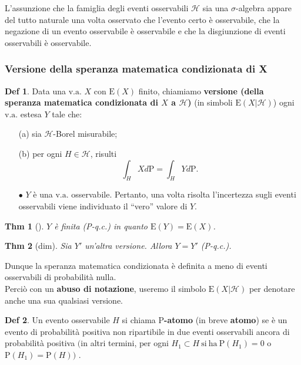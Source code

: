 \documentclass[a4paper,11pt]{article}
\theoremstyle{plain}
\newtheorem{thm}{Thm}[section]
\theoremstyle{definition}
\newtheorem{defn}{Def}[section]
\theoremstyle{remark}
\begin{document}
\noindent
L'assunzione che la famiglia degli eventi osservabili $\mathcal{H}$ sia una $\sigma$-algebra appare del tutto naturale una volta osservato che l'evento certo è osservabile, che la negazione di un evento osservabile è osservabile $\mathrm{e}$ che la disgiunzione di eventi osservabili è osservabile.

\subsubsection{Versione della speranza matematica condizionata di X}
\begin{defn}
Data una  $\mathrm{v}.\mathrm{a}.$  $X$ con $\mathrm{E}(X)$ finito, chiamiamo \textbf{versione (della speranza matematica condizionata di $X$ a $\mathcal{H}$)} (in simboli $\mathrm{E}(X|\mathcal{H})$) ogni $\mathrm{v}.\mathrm{a}$. estesa $Y$ tale che:
\begin{itemize}
\item [(a)] sia $\mathcal{H}$-Borel misurabile;
\item [(b)] per ogni $H\in \mathcal{H}$, risulti
$$
\int_{H}Xd\mathrm{P}=\int_{H}Yd\mathrm{P}.
$$
\end{itemize} 
\end{defn}

\begin{itemize}
    \item[$\bullet$] $Y$ è una $\mathrm{v}.\mathrm{a}.$ osservabile.  Pertanto, una volta risolta l'incertezza sugli eventi osservabili viene individuato il ``vero'' valore di $Y.$  
\end{itemize}


\begin{thm}[] $Y$ è finita (P-q.c.) in quanto $\mathrm{E}(Y)=\mathrm{E}(X)$.
\end{thm}
\begin{thm}[dim] Sia $Y'$ un'altra versione. Allora $Y=Y'$ (P-q.c.).
\end{thm}

\noindent
Dunque la speranza matematica condizionata è definita a meno di eventi osservabili di probabilità nulla.\\

\noindent Perciò con un \textbf{abuso di notazione}, useremo il simbolo $\mathrm{E}(X|\mathcal{H})$ per denotare anche una sua qualsiasi versione.


\begin{defn} Un evento osservabile $H$ si chiama \textbf{$\mathrm{P}$-atomo} (in breve \textbf{atomo}) se è un evento di probabilità positiva non ripartibile in due eventi osservabili ancora di probabilità positiva $(\mathrm{i}\mathrm{n}$ altri termini, $\mathrm{p}\mathrm{e}\mathrm{r}$ ogni $H_{1}\subset H\ \mathrm{s}\mathrm{i}\ \mathrm{h}\mathrm{a}\ \mathrm{P}(H_{1})=0$ o $ \mathrm{P}(H_{1})=\mathrm{P}(H))$ .
\end{defn}
\end{document}
